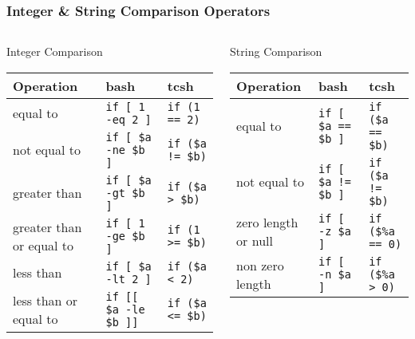 \documentclass[slidestop,mathserif,compress,xcolor=svgnames]{beamer}
\newenvironment{eblock}[0]
{
\begin{beamerboxesrounded}[upper=uppercol2,lower=lowercol2,shadow=true]}
{\end{beamerboxesrounded}}
\begin{document}
\begin{frame}
  \frametitle{\small Integer \& String Comparison Operators}
  \begin{columns}
    \column{\textwidth}
    \vspace{-0.5cm}
    \begin{eblock}{Integer Comparison}
      \begin{tabular}{lll}
        Operation & \textbf{bash} & \textbf{tcsh} \\
        \hline
        equal to & \texttt{if [ 1 -eq 2 ]} & \texttt{if (1 == 2)} \\
        not equal to & \texttt{if [ \$a -ne \$b ]} & \texttt{if (\$a != \$b)}\\
        greater than & \texttt{if [ \$a -gt \$b ]} & \texttt{if (\$a > \$b)}\\
        greater than or equal to & \texttt{if [ 1 -ge \$b ]} & \texttt{if (1 >= \$b)}\\
        less than & \texttt{if [ \$a -lt 2 ]} & \texttt{if (\$a < 2)}\\
        less than or equal to & \texttt{if [[ \$a -le \$b ]]} & \texttt{if (\$a <= \$b)} \\
        \hline
      \end{tabular}
    \end{eblock}
    \begin{eblock}{String Comparison}
      \begin{tabular}{lll}
        Operation & \textbf{bash} & \textbf{tcsh} \\
        \hline
        equal to & \texttt{if [ \$a == \$b ]} & \texttt{if (\$a == \$b)}\\
        not equal to & \texttt{if [ \$a != \$b ]} & \texttt{if (\$a != \$b)}\\
        zero length or null & \texttt{if [ -z \$a ] } & \texttt{if (\$\%a == 0)}\\
        non zero length & \texttt{if [ -n \$a ] } & \texttt{if (\$\%a > 0)}\\
        \hline
      \end{tabular}
    \end{eblock}
  \end{columns}
\end{frame}
\end{document}
